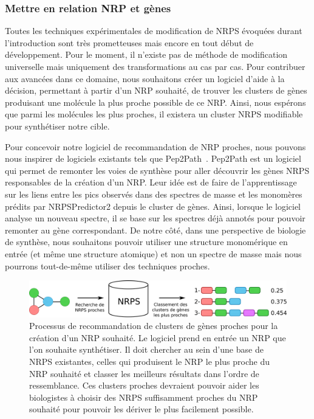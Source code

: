 \subsubsection{Mettre en relation NRP et gènes}

Toutes les techniques expérimentales de modification de NRPS évoquées durant l'introduction sont très prometteuses mais encore en tout début de développement.
Pour le moment, il n'existe pas de méthode de modification universelle mais uniquement des transformations au cas par cas.
Pour contribuer aux avancées dans ce domaine, nous souhaitons créer un logiciel d'aide à la décision, permettant à partir d'un NRP souhaité, de trouver les clusters de gènes produisant une molécule la plus proche possible de ce NRP.
Ainsi, nous espérons que parmi les molécules les plus proches, il existera un cluster NRPS modifiable pour synthétiser notre cible.

Pour concevoir notre logiciel de recommandation de NRP proches, nous pouvons nous inspirer de logiciels existants tels que Pep2Path~\cite{medema_pep2path:_2014}.
Pep2Path est un logiciel qui permet de remonter les voies de synthèse pour aller découvrir les gènes NRPS responsables de la création d'un NRP.
Leur idée est de faire de l'apprentissage sur les liens entre les pics observés dans des spectres de masse et les monomères prédits par NRPSPredictor2 depuis le cluster de gènes.
Ainsi, lorsque le logiciel analyse un nouveau spectre, il se base sur les spectres déjà annotés pour pouvoir remonter au gène correspondant.
De notre côté, dans une perspective de biologie de synthèse, nous souhaitons pouvoir utiliser une structure monomérique en entrée (et même une structure atomique) et non un spectre de masse mais nous pourrons tout-de-même utiliser des techniques proches.

\begin{figure}[h!]
  \begin{center}
    \includegraphics[width=450px]{Figures/synthese/recommandation.png}
    \caption{\label{reco}Processus de recommandation de clusters de gènes proches pour la création d'un NRP souhaité.
    Le logiciel prend en entrée un NRP que l'on souhaite synthétiser.
    Il doit chercher au sein d'une base de NRPS existantes, celles qui produisent le NRP le plus proche du NRP souhaité et classer les meilleurs résultats dans l'ordre de ressemblance.
    Ces clusters proches devraient pouvoir aider les biologistes à choisir des NRPS suffisamment proches du NRP souhaité pour pouvoir les dériver le plus facilement possible.}
  \end{center}
\end{figure}

